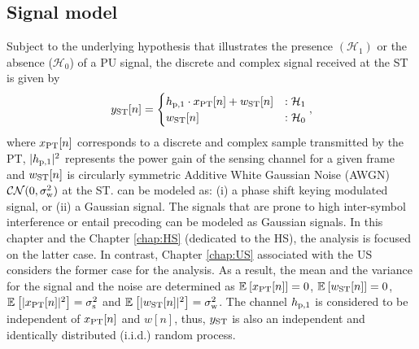\subsection{Signal model}
Subject to the underlying hypothesis that illustrates the presence $(\mathcal{H}_1)$ or the absence ($\mathcal{H}_0$) of a PU signal, the discrete and complex signal received at the ST is given by  
\begin{equation}
y_{\text{ST}}[n] = 
\begin{cases}
h_{\text{p,1}} \cdot x_{\text{PT}}[n] + w_{\text{ST}}[n] & : \mathcal{H}_1 \\
w_{\text{ST}}[n] & :\mathcal{H}_0
\end{cases},
\label{eq_IS:sys_mod_p1s}
\end{equation}
where $x_{\text{PT}}[n]$ corresponds to a discrete and complex sample transmitted by the PT, $|h_{\text{p,1}}|^2$ represents the power gain of the sensing channel for a given frame and $w_{\text{ST}}[n]$ is circularly symmetric Additive White Gaussian Noise (AWGN) $\mathcal{CN}(0, \sigma^2_{\text{w}})$ at the ST.  can be modeled as: (i) a phase shift keying modulated signal, or (ii) a Gaussian signal. The signals that are prone to high inter-symbol interference or entail precoding can be modeled as Gaussian signals. In this chapter and the Chapter \ref{chap:HS} (dedicated to the HS), the analysis is focused on the latter case. In contrast, Chapter \ref{chap:US} associated with the US considers the former case for the analysis. As a result, the mean and the variance for the signal and the noise are determined as ${\mathbb E}_{}\left[ x_{\text{PT}}[n] \right] = 0$, ${\mathbb E}_{}\left[ w_{\text{ST}}[n] \right] = 0$, ${\mathbb E}_{}\left[ |x_{\text{PT}}[n]|^2 \right] = \sigma^2_{\text{s}}$ and ${\mathbb E}_{}\left[ |w_{\text{ST}}[n]|^2 \right] = \sigma^2_{\text{w}}$. The channel $h_{\text{p,1}}$ is considered to be independent of $x_{\text{PT}}[n]$ and $w[n]$, thus, $y_{\text{ST}}$ is also an independent and identically distributed (i.i.d.) random process. %

